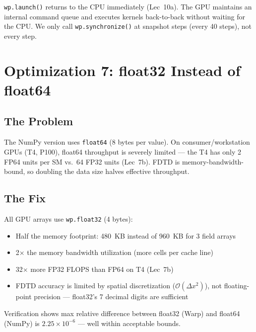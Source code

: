 \documentclass[11pt,a4paper]{article}
\begin{document}
\begin{tcolorbox}[colback=green!3, colframe=okgreen, title=\textbf{Fix \#6: Non-blocking launches}]
\texttt{wp.launch()} returns to the CPU immediately (Lec~10a). The GPU maintains an internal command queue and executes kernels back-to-back without waiting for the CPU. We only call \texttt{wp.synchronize()} at snapshot steps (every 40 steps), not every step.
\end{tcolorbox}


\section{Optimization 7: float32 Instead of float64}

\subsection{The Problem}

\begin{tcolorbox}[colback=red!3, colframe=warnred, title=\textbf{Bottleneck \#7: Memory bandwidth}]
The NumPy version uses \texttt{float64} (8 bytes per value). On consumer/workstation GPUs (T4, P100), float64 throughput is severely limited --- the T4 has only 2 FP64 units per SM vs.\ 64 FP32 units (Lec~7b). FDTD is memory-bandwidth-bound, so doubling the data size halves effective throughput.
\end{tcolorbox}

\subsection{The Fix}

All GPU arrays use \texttt{wp.float32} (4 bytes):

\begin{tcolorbox}[colback=green!3, colframe=okgreen, title=\textbf{Fix \#7: Use float32}]
\begin{itemize}[nosep]
    \item Half the memory footprint: 480~KB instead of 960~KB for 3 field arrays
    \item 2$\times$ the memory bandwidth utilization (more cells per cache line)
    \item 32$\times$ more FP32 FLOPS than FP64 on T4 (Lec~7b)
    \item FDTD accuracy is limited by spatial discretization ($\mathcal{O}(\Delta x^2)$), not floating-point precision --- float32's 7 decimal digits are sufficient
\end{itemize}
Verification shows max relative difference between float32 (Warp) and float64 (NumPy) is $2.25 \times 10^{-6}$ --- well within acceptable bounds.
\end{tcolorbox}
\end{document}
